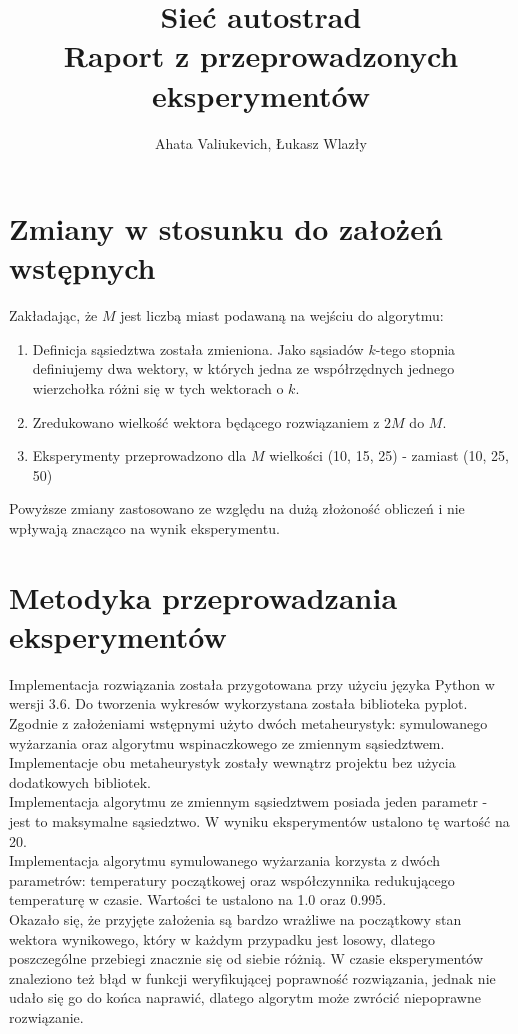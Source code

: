 \documentclass{article}
\title{Sieć autostrad \\ \small{Raport z przeprowadzonych eksperymentów}}
\author{Ahata Valiukevich, Łukasz Wlazły}
\date{}
\begin{document}
\maketitle
\newpage

\section{Zmiany w stosunku do założeń wstępnych}
Zakładając, że $M$ jest liczbą miast podawaną na wejściu do algorytmu:
\begin{enumerate}
	\item Definicja sąsiedztwa została zmieniona. Jako sąsiadów $k$-tego stopnia definiujemy dwa wektory, w których jedna ze współrzędnych jednego wierzchołka różni się w tych wektorach o $k$.
	\item Zredukowano wielkość wektora będącego rozwiązaniem z $2M$ do $M$.
	\item Eksperymenty przeprowadzono dla $M$ wielkości (10, 15, 25) - zamiast (10, 25, 50)
\end{enumerate}
Powyższe zmiany zastosowano ze względu na dużą złożoność obliczeń i nie wpływają znacząco na wynik eksperymentu.

\section{Metodyka przeprowadzania eksperymentów}
Implementacja rozwiązania została przygotowana przy użyciu języka Python w wersji 3.6. Do tworzenia wykresów wykorzystana została biblioteka pyplot.
Zgodnie z założeniami wstępnymi użyto dwóch metaheurystyk: symulowanego wyżarzania oraz algorytmu wspinaczkowego ze zmiennym sąsiedztwem.
Implementacje obu metaheurystyk zostały wewnątrz projektu bez użycia dodatkowych bibliotek. \\

Implementacja algorytmu ze zmiennym sąsiedztwem posiada jeden parametr - jest to maksymalne sąsiedztwo. W wyniku eksperymentów ustalono tę wartość na 20. \\

Implementacja algorytmu symulowanego wyżarzania korzysta z dwóch parametrów: temperatury początkowej oraz współczynnika redukującego temperaturę w czasie.
Wartości te ustalono na 1.0 oraz 0.995.\\

Okazało się, że przyjęte założenia są bardzo wrażliwe na początkowy stan wektora wynikowego, który w każdym przypadku jest losowy, dlatego poszczególne przebiegi znacznie się od siebie różnią. W czasie eksperymentów znaleziono też błąd w funkcji weryfikującej poprawność rozwiązania, jednak nie udało się go do końca naprawić, dlatego algorytm może zwrócić niepoprawne rozwiązanie.
\end{document}
